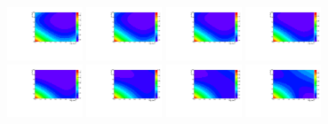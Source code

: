 \begin{figure}[thb]
  \centering
\includegraphics[width=0.2\textwidth]{figures/sec-background/correlation/res_th2F_exp_th2f_res_alpha_00_n005.pdf}
\includegraphics[width=0.2\textwidth]{figures/sec-background/correlation/res_th2F_exp_th2f_res_alpha_01_n005.pdf}
\includegraphics[width=0.2\textwidth]{figures/sec-background/correlation/res_th2F_exp_th2f_res_alpha_02_n005.pdf}
\includegraphics[width=0.2\textwidth]{figures/sec-background/correlation/res_th2F_exp_th2f_res_alpha_03_n005.pdf}
\includegraphics[width=0.2\textwidth]{figures/sec-background/correlation/res_th2F_exp_th2f_res_alpha_04_n005.pdf}
\includegraphics[width=0.2\textwidth]{figures/sec-background/correlation/res_th2F_exp_th2f_res_alpha_05_n005.pdf}
\includegraphics[width=0.2\textwidth]{figures/sec-background/correlation/res_th2F_exp_th2f_res_alpha_06_n005.pdf}
\includegraphics[width=0.2\textwidth]{figures/sec-background/correlation/res_th2F_exp_th2f_res_alpha_07_n005.pdf}

\end{figure}
